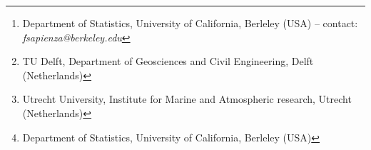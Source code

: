 
\author{ 
    Facundo Sapienza
    \thanks{Department of Statistics, University of California, Berleley (USA) -- contact: \textit{fsapienza@berkeley.edu}}, 
    Jordi Bolibar
    \thanks{TU Delft, Department of Geosciences and Civil Engineering, Delft (Netherlands)},
    \thanks{Utrecht University, Institute for Marine and Atmospheric research, Utrecht (Netherlands)},
    Fernando Pérez
    \thanks{Department of Statistics, University of California, Berleley (USA)}
}
